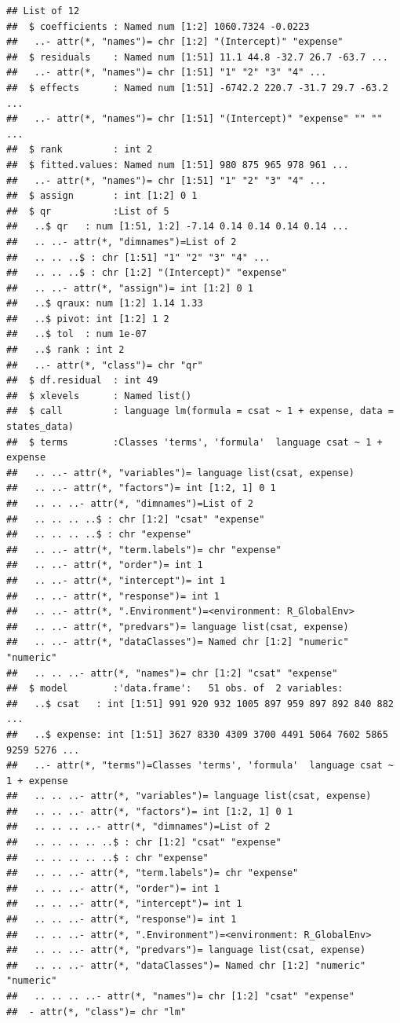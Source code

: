 \documentclass[
]{book}
\begin{document}
\begin{verbatim}
## List of 12
##  $ coefficients : Named num [1:2] 1060.7324 -0.0223
##   ..- attr(*, "names")= chr [1:2] "(Intercept)" "expense"
##  $ residuals    : Named num [1:51] 11.1 44.8 -32.7 26.7 -63.7 ...
##   ..- attr(*, "names")= chr [1:51] "1" "2" "3" "4" ...
##  $ effects      : Named num [1:51] -6742.2 220.7 -31.7 29.7 -63.2 ...
##   ..- attr(*, "names")= chr [1:51] "(Intercept)" "expense" "" "" ...
##  $ rank         : int 2
##  $ fitted.values: Named num [1:51] 980 875 965 978 961 ...
##   ..- attr(*, "names")= chr [1:51] "1" "2" "3" "4" ...
##  $ assign       : int [1:2] 0 1
##  $ qr           :List of 5
##   ..$ qr   : num [1:51, 1:2] -7.14 0.14 0.14 0.14 0.14 ...
##   .. ..- attr(*, "dimnames")=List of 2
##   .. .. ..$ : chr [1:51] "1" "2" "3" "4" ...
##   .. .. ..$ : chr [1:2] "(Intercept)" "expense"
##   .. ..- attr(*, "assign")= int [1:2] 0 1
##   ..$ qraux: num [1:2] 1.14 1.33
##   ..$ pivot: int [1:2] 1 2
##   ..$ tol  : num 1e-07
##   ..$ rank : int 2
##   ..- attr(*, "class")= chr "qr"
##  $ df.residual  : int 49
##  $ xlevels      : Named list()
##  $ call         : language lm(formula = csat ~ 1 + expense, data = states_data)
##  $ terms        :Classes 'terms', 'formula'  language csat ~ 1 + expense
##   .. ..- attr(*, "variables")= language list(csat, expense)
##   .. ..- attr(*, "factors")= int [1:2, 1] 0 1
##   .. .. ..- attr(*, "dimnames")=List of 2
##   .. .. .. ..$ : chr [1:2] "csat" "expense"
##   .. .. .. ..$ : chr "expense"
##   .. ..- attr(*, "term.labels")= chr "expense"
##   .. ..- attr(*, "order")= int 1
##   .. ..- attr(*, "intercept")= int 1
##   .. ..- attr(*, "response")= int 1
##   .. ..- attr(*, ".Environment")=<environment: R_GlobalEnv> 
##   .. ..- attr(*, "predvars")= language list(csat, expense)
##   .. ..- attr(*, "dataClasses")= Named chr [1:2] "numeric" "numeric"
##   .. .. ..- attr(*, "names")= chr [1:2] "csat" "expense"
##  $ model        :'data.frame':   51 obs. of  2 variables:
##   ..$ csat   : int [1:51] 991 920 932 1005 897 959 897 892 840 882 ...
##   ..$ expense: int [1:51] 3627 8330 4309 3700 4491 5064 7602 5865 9259 5276 ...
##   ..- attr(*, "terms")=Classes 'terms', 'formula'  language csat ~ 1 + expense
##   .. .. ..- attr(*, "variables")= language list(csat, expense)
##   .. .. ..- attr(*, "factors")= int [1:2, 1] 0 1
##   .. .. .. ..- attr(*, "dimnames")=List of 2
##   .. .. .. .. ..$ : chr [1:2] "csat" "expense"
##   .. .. .. .. ..$ : chr "expense"
##   .. .. ..- attr(*, "term.labels")= chr "expense"
##   .. .. ..- attr(*, "order")= int 1
##   .. .. ..- attr(*, "intercept")= int 1
##   .. .. ..- attr(*, "response")= int 1
##   .. .. ..- attr(*, ".Environment")=<environment: R_GlobalEnv> 
##   .. .. ..- attr(*, "predvars")= language list(csat, expense)
##   .. .. ..- attr(*, "dataClasses")= Named chr [1:2] "numeric" "numeric"
##   .. .. .. ..- attr(*, "names")= chr [1:2] "csat" "expense"
##  - attr(*, "class")= chr "lm"
\end{verbatim}
\end{document}
